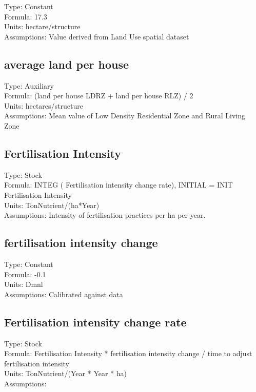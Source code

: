 \documentclass[
  11pt,
]{book}
\begin{document}
Type: Constant\\
Formula: 17.3\\
Units: hectare/structure\\
Assumptions: Value derived from Land Use spatial dataset

\hypertarget{average-land-per-house}{%
\subsection{average land per house}\label{average-land-per-house}}

Type: Auxiliary\\
Formula: (land per house LDRZ + land per house RLZ) / 2\\
Units: hectares/structure\\
Assumptions: Mean value of Low Density Residential Zone and Rural Living Zone

\hypertarget{fertilisation-intensity}{%
\subsection{Fertilisation Intensity}\label{fertilisation-intensity}}

Type: Stock\\
Formula: INTEG ( Fertilisation intensity change rate), INITIAL = INIT Fertilisation Intensity\\
Units: TonNutrient/(ha*Year)\\
Assumptions: Intensity of fertilisation practices per ha per year.

\hypertarget{fertilisation-intensity-change}{%
\subsection{fertilisation intensity change}\label{fertilisation-intensity-change}}

Type: Constant\\
Formula: -0.1\\
Units: Dmnl\\
Assumptions: Calibrated against data

\hypertarget{fertilisation-intensity-change-rate}{%
\subsection{Fertilisation intensity change rate}\label{fertilisation-intensity-change-rate}}

Type: Stock\\
Formula: Fertilisation Intensity * fertilisation intensity change / time to adjust fertilisation intensity\\
Units: TonNutrient/(Year * Year * ha)\\
Assumptions:
\end{document}
